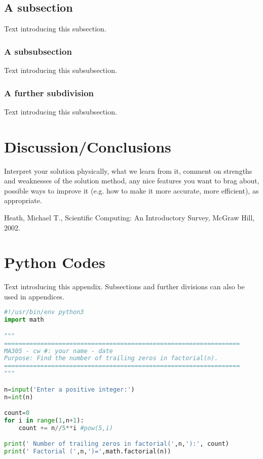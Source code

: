 \documentclass[11pt]{article}
\begin{document}
\subsection{A subsection}
%
Text introducing this subsection. 

\subsubsection{A subsubsection}
%
Text introducing this subsubsection. 

\subsubsection{A further subdivision}
%
Text introducing this subsubsection. 

\section{Discussion/Conclusions}\label{S:5}
Interpret your solution physically, what we learn from it, comment on strengths and weaknesses of the solution method, any nice features you want to brag about, possible ways to improve it (e.g. how to make it more accurate, more efficient), as appropriate.


\begin{thebibliography}{100}
Heath, Michael T., Scientific Computing: An Introductory Survey, McGraw Hill, 2002.
%
%

\end{thebibliography}



\newpage
\appendix 
\setcounter{section}{0}           
\section{Python Codes}\label{S:A}
%
Text introducing this appendix. Subsections and further divisions can also be used in appendices. 

\begin{lstlisting}[language=Python]
#!/usr/bin/env python3 
import math

"""
=================================================================
MA305 - cw #: your name - date
Purpose: Find the number of trailing zeros in factorial(n). 
=================================================================
"""

n=input('Enter a positive integer:')
n=int(n)

count=0
for i in range(1,n+1):
    count += n//5**i #pow(5,i)

print(' Number of trailing zeros in factorial(',n,'):', count)
print(' Factorial (',n,')=',math.factorial(n))


\end{lstlisting} 
\end{document}
